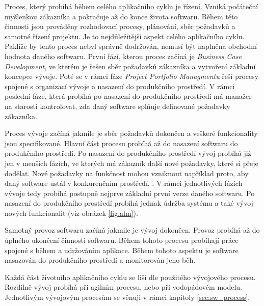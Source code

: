 \documentclass[czech,master]{diploma}
\begin{document}
Proces, který probíhá během celého aplikačního cyklu je řízení. Vzniká počáteční myšlenkou zákazníka a pokračuje až do konce života softwaru. Během této činnosti jsou prováděny rozhodovací procesy, plánování, sběr požadavků a samotné řízení projektu. Je to nejdůležitější aspekt celého aplikačního cyklu. Pakliže by tento proces nebyl správně dodržován, nemusí být naplněna obchodní hodnota daného softwaru. \cite{alm_chappell} První fází, kterou proces začíná je \textit{Business Case Development}, ve kterém je řešen sběr požadavků zákazníka a vytvoření základní koncepce vývoje. Poté se v rámci fáze \textit{Project Portfolio Managmentu} řeší procesy spojené s organizací vývoje a nasazení do produkčního prostředí. V rámci poslední fáze, která probíhá po nasazení do produkčního prostředí má manažer na starosti kontrolovat, zda daný software splňuje definované požadavky zákazníka.

Proces vývoje začíná jakmile je sběr požadavků dokončen a veškeré funkcionality jsou specifikované. Hlavní část procesu probíhá až do nasazení softwaru do produkčního prostředí. Po nasazení do produkčního prostředí vývoj probíhá již jen v menších fázích, ve kterých má zákazník další nové požadavky, které si přeje dodělat. Nové požadavky na funkčnost mohou vzniknout například proto, aby daný software ustál v konkurenčním prostředí. \cite{alm_chappell}. V rámci jednotlivých fázích vývoje tedy probíhá postupně nejprve základní první verze daného softwaru. Po nasazení do produkčního prostředí probíhá jednak údržba systému a také vývoj nových funkcionalit (viz obrázek \ref{fig:alm}).

Samotný provoz softwaru začíná jakmile je vývoj dokončen. Provoz probíhá až do úplného ukončení činnosti softwaru. Během tohoto procesu probíhají práce spojené s během a udržováním aplikace. Během tohoto aspektu je software nasazován do produkčního prostředí a monitorován jeho běh.  \cite{alm_chappell}

Každá část životního aplikačního cyklu se liší dle použitého vývojového procesu. Rozdílně vývoj probíhá při agilním procesu, nebo při vodopádovém modelu. Jednotlivým vývojovým procesům se věnuji v rámci kapitoly \ref{sec:sw_process}.


\end{document}
